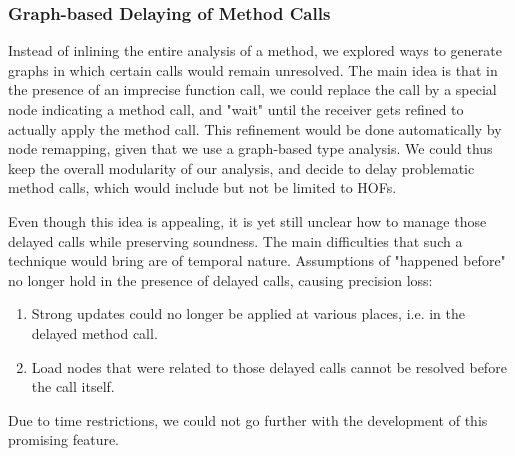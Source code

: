 \subsubsection{Graph-based Delaying of Method Calls}
Instead of inlining the entire analysis of a method, we explored ways to
generate graphs in which certain calls would remain unresolved. The main idea
is that in the presence of an imprecise function call, we could replace the
call by a special node indicating a method call, and "wait" until the receiver
gets refined to actually apply the method call. This refinement would be done
automatically by node remapping, given that we use a graph-based type analysis.
We could thus keep the overall modularity of our analysis, and decide to delay
problematic method calls, which would include but not be limited to HOFs.

Even though this idea is appealing, it is yet still unclear how to manage those
delayed calls while preserving soundness. The main difficulties that such a
technique would bring are of temporal nature. Assumptions of "happened before"
no longer hold in the presence of delayed calls, causing precision loss:
\begin{enumerate}
    \item Strong updates could no longer be applied at various places, i.e. in
    the delayed method call.
    \item Load nodes that were related to those delayed calls cannot be resolved
    before the call itself.
\end{enumerate}
Due to time restrictions, we could not go further with the development of this
promising feature.

